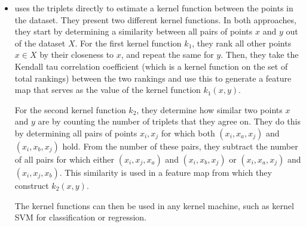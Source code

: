 \begin{itemize}



    \item %
        \cite{kleindessnerKernelFunctionsBased2017} uses the triplets directly to estimate a kernel function between the points in the dataset. 
        They present two different kernel functions. In both approaches, they start by determining a similarity between all pairs of points $x$ and $y$ out of the dataset $X$.
        For the first kernel function $k_1$, they rank all other points $x \in X$ by their closeness to $x$, and repeat the same for $y$. Then, they take 
        the Kendall tau correlation coefficient (which is a kernel function on the set of total rankings) between the two rankings and use this to generate a feature
        map that serves as the value of the kernel function $k_1(x,y)$. 

        For the second kernel function $k_2$, they determine how similar two points $x$ and $y$ are by counting the number of triplets that they agree on. 
        They do this by determining all pairs of points $x_i, x_j$ for which both $(x_i, x_a, x_j)$ and $(x_i, x_b, x_j)$ hold. From the number of these pairs, 
        they subtract the number of all pairs for which either $(x_i, x_j, x_a)$ and $(x_i, x_b, x_j)$ or $(x_i, x_a, x_j)$ and $(x_i, x_j, x_b)$. This similarity is used in 
        a feature map from which they construct $k_2(x,y)$.

        The kernel functions can then be used in any kernel machine, such as kernel SVM for classification or regression. 


\end{itemize}
